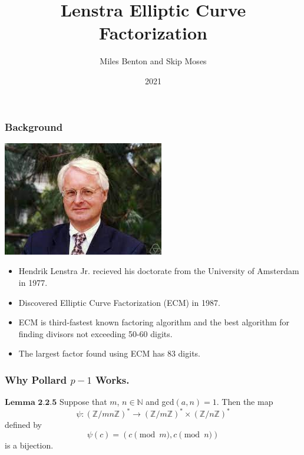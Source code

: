 \documentclass{beamer}
\title{Lenstra Elliptic Curve Factorization}
\author{Miles Benton and Skip Moses}
\institute{MATH 317}
\date{2021}
\begin{document}
\frame{\titlepage}


\begin{frame}
\frametitle{Background}
\pause

\center
\includegraphics[scale = .5]{lenstra.jpeg}

\begin{itemize}[<+->]
\item Hendrik Lenstra Jr. recieved his doctorate from the University of Amsterdam in 1977.

\item Discovered Elliptic Curve Factorization (ECM) in 1987.

\item ECM is third-fastest known factoring algorithm and the best algorithm for finding divisors not exceeding 50-60 digits.

\item The largest factor found using ECM has 83 digits.
\end{itemize}
\end{frame}

\begin{frame}
\frametitle{Why Pollard $p-1$ Works.}
\pause
$\textbf{Lemma 2.2.5}$ Suppose that $m$, $n \in \mathbb{N}$ and gcd$(a,n) = 1$. Then the map
$$
    \psi : \left( \mathbb{Z}/mn\mathbb{Z} \right)^* \rightarrow \left( \mathbb{Z}/m\mathbb{Z} \right)^* \times \left( \mathbb{Z}/n\mathbb{Z} \right)^*
$$
defined by
$$
    \psi(c) = (c \pmod{m}, c\pmod{n})
$$
is a bijection.

\end{frame}
\end{document}
